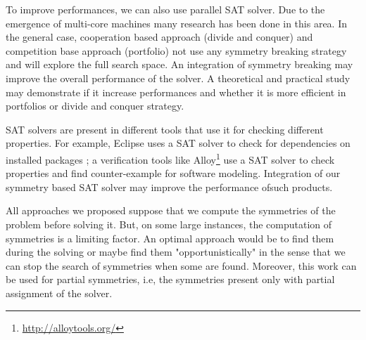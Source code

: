 To improve performances, we can also use parallel SAT solver. Due to the emergence of multi-core machines
many research has been done in this area. In the general case, cooperation based approach (divide and conquer) and
competition base approach (portfolio)  not use any symmetry breaking strategy and will explore the full search space.
An integration of symmetry breaking may improve the overall performance of the solver.
A theoretical and practical study may demonstrate if it increase performances and whether it is more efficient in 
portfolios or divide and conquer strategy.


SAT solvers are present in different tools that use it for checking different properties. For example, 
 Eclipse uses a SAT solver to check for dependencies on installed packages \cite{le2008sat};
a verification tools like Alloy\footnote{\url{http://alloytools.org/}} use a SAT solver to check properties and find
counter-example for software modeling. Integration of our symmetry based SAT solver may improve the performance ofsuch products.


All approaches we proposed suppose that we compute the symmetries of the problem before solving it.
But, on some large instances, the computation of symmetries is a limiting factor. An optimal approach
would be to find them during the solving or maybe find them "opportunistically" in the sense that we can stop the search of symmetries when some are found.
Moreover, this work can be used for partial symmetries, i.e, 
the symmetries present only with partial assignment of the solver.






 
